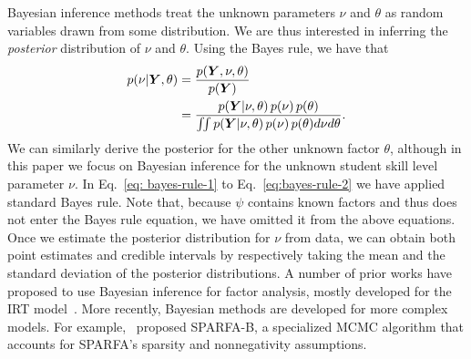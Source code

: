 \documentclass{edm_article}
\newcommand{\ml}[1]{\textcolor{orange}{\bf [LAN bandit: #1]}}
\newcommand{\jack}[1]{\textcolor{purple}{\bf [jack the ripper: #1]}}
\begin{document}
Bayesian inference methods treat the unknown parameters $\nu$ and $\theta$ as random variables drawn from some distribution. We are thus interested in inferring the \textit{posterior} distribution of $\nu$ and $\theta$. Using the Bayes rule, we have that 
\begin{align}
    p(\nu | {\bm{Y}}, \theta)  &= \frac{p({\bm{Y}}, \nu, \theta)}{p({\bm{Y}})} \label{eq: bayes-rule-1}\\
    &= \frac{p({\bm{Y}} | \nu, \theta)\,p(\nu)\,p(\theta)}{\iint p({\bm{Y}} | \nu, \theta)\,p(\nu)\,p(\theta) d\nu d\theta}. \label{eq:bayes-rule-2}
\end{align}
We can similarly derive the posterior for the other unknown factor $\theta$, although in this paper we focus on Bayesian inference for the unknown student skill level parameter $\nu$.
In Eq.~\ref{eq: bayes-rule-1} to Eq.~\ref{eq:bayes-rule-2} we have applied standard Bayes rule. Note that, because $\psi$ contains known factors and thus does not enter the Bayes rule equation, we have omitted it from the above equations. Once we estimate the posterior distribution for $\nu$ from data, we can obtain both point estimates and credible intervals by respectively taking the mean and the standard deviation of the posterior distributions. A number of prior works have proposed to use Bayesian inference for factor analysis, mostly developed for the IRT model~\cite{fox2001bayesian,mislevy1986bayes}. More recently, Bayesian methods are developed for more complex models. For example,~\cite{lan14a} proposed SPARFA-B, a specialized MCMC algorithm that accounts for SPARFA's sparsity and nonnegativity assumptions.
\end{document}
